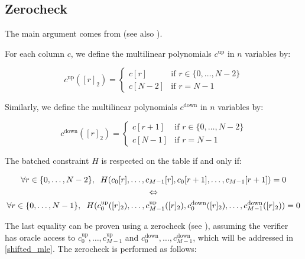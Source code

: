 \documentclass{article}
\begin{document}
\subsection{Zerocheck} \label{zerocheck}

The main argument comes from \cite{ccs} (see also \cite{simple_multivariate_AIR}).

For each column $c$, we define the multilinear polynomials $c^{\text{up}}$ in $n$ variables by:

$$c^{\text{up}}([r]_2)  = \begin{cases}
			c[r] & \text{if } r \in \{0, \dots, N-2\}\\
            c[N-2] & \text{if } r = N-1
		 \end{cases}$$

Similarly, we define the multilinear polynomials $c^{\text{down}}$ in $n$ variables by:

$$c^{\text{down}}([r]_2)  = \begin{cases}
			c[r+1] & \text{if } r \in \{0, \dots, N-2\}\\
            c[N-1] & \text{if } r = N-1
		 \end{cases}$$

The batched constraint $H$ is respected on the table if and only if:

$$\begin{gathered}
\forall r \in \{0, \dots, N-2\}, \hspace{2mm} H(c_0[r], \dots, c_{M-1}[r], c_0[r+1], \dots, c_{M-1}[r+1]) = 0 \\
\Leftrightarrow\\
\forall r \in \{0, \dots, N-1\}, \hspace{2mm} H(c_0^{\text{up}}([r]_2), \dots, c_{M-1}^{\text{up}}([r]_2), c_0^{\text{down}}([r]_2), \dots, c_{M-1}^{\text{down}}([r]_2)) = 0
\end{gathered}$$

The last equality can be proven using a zerocheck (see \cite{hyperplonk}), assuming the verifier has oracle access to $c_0^{\text{up}}, \dots, c_{M-1}^{\text{up}}$ and $ c_0^{\text{down}}, \dots, c_{M-1}^{\text{down}}$, which will be addressed in \ref{shifted_mle}. The zerocheck is performed as follows:
\end{document}
